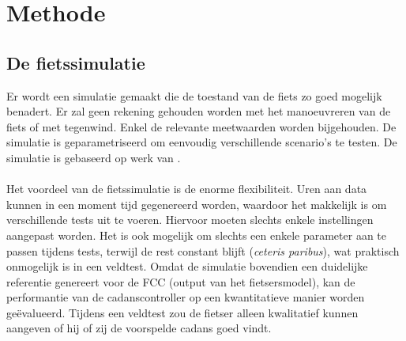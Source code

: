 \chapter{Methode}
\section{De fietssimulatie}
Er wordt een simulatie gemaakt die de toestand van de fiets zo goed mogelijk benadert. Er zal geen rekening gehouden worden met het manoeuvreren van de fiets of met tegenwind. Enkel de relevante meetwaarden worden bijgehouden. De simulatie is geparametriseerd om eenvoudig verschillende scenario’s te testen. De simulatie is gebaseerd op werk van \cite{hardware implementation}.
\\\\
Het voordeel van de fietssimulatie is de enorme flexibiliteit. Uren aan data kunnen in een moment tijd gegenereerd worden, waardoor het makkelijk is om verschillende tests uit te voeren. Hiervoor moeten slechts enkele instellingen aangepast worden. Het is ook mogelijk om slechts een enkele parameter aan te passen tijdens tests, terwijl de rest constant blijft (\textit{ceteris paribus}), wat praktisch onmogelijk is in een veldtest. Omdat de simulatie bovendien een duidelijke referentie genereert voor de FCC (output van het fietsersmodel), kan de performantie van de cadanscontroller op een kwantitatieve manier worden geëvalueerd. Tijdens een veldtest zou de fietser alleen kwalitatief kunnen aangeven of hij of zij de voorspelde cadans goed vindt. 
